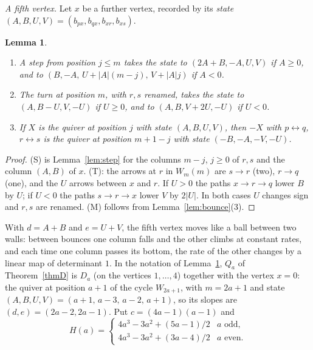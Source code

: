 \documentclass[11pt]{amsart}
\newtheorem{lemma}[theorem]{Lemma}
\theoremstyle{definition}
\theoremstyle{remark}
\begin{document}
\emph{A fifth vertex.} Let $x$ be a further vertex, recorded by its \emph{state} $(A,B,U,V)=(b_{px},b_{qx},b_{xr},b_{xs})$.

\begin{lemma}\label{lem:fifth}
\begin{enumerate}
\item[(S)] A step from position $j\le m$ takes the state to $(2A+B,-A,U,V)$ if $A\ge0$, and to $(B,-A,\,U+|A|(m-j),\,V+|A|j)$ if $A<0$.
\item[(T)] The turn at position $m$, with $r,s$ renamed, takes the state to $(A,B-U,V,-U)$ if $U\ge0$, and to $(A,B,V+2U,-U)$ if $U<0$.
\item[(M)] If $X$ is the quiver at position $j$ with state $(A,B,U,V)$, then $-X$ with $p\leftrightarrow q$, $r\leftrightarrow s$ is the quiver at position $m+1-j$ with state $(-B,-A,-V,-U)$.
\end{enumerate}
\end{lemma}
\begin{proof}
(S) is Lemma~\ref{lem:step} for the columns $m-j$, $j\ge0$ of $r,s$ and the column $(A,B)$ of $x$. (T): the arrows at $r$ in $W_m(m)$ are $s\to r$ (two), $r\to q$ (one), and the $U$ arrows between $x$ and $r$. If $U>0$ the paths $x\to r\to q$ lower $B$ by $U$; if $U<0$ the paths $s\to r\to x$ lower $V$ by $2|U|$. In both cases $U$ changes sign and $r,s$ are renamed. (M) follows from Lemma~\ref{lem:bounce}(3).
\end{proof}

With $d=A+B$ and $e=U+V$, the fifth vertex moves like a ball between two walls: between bounces one column falls and the other climbs at constant rates, and each time one column passes its bottom, the rate of the other changes by a linear map of determinant $1$. In the notation of Lemma~\ref{lem:fifth}, $Q_a$ of Theorem~\ref{thmD} is $D_a$ (on the vertices $1,\dots,4$) together with the vertex $x=0$: the quiver at position $a+1$ of the cycle $W_{2a+1}$, with $m=2a+1$ and state $(A,B,U,V)=(a+1,\,a-3,\,a-2,\,a+1)$, so its slopes are $(d,e)=(2a-2,2a-1)$. Put $c=(4a-1)(a-1)$ and
\[H(a)=\begin{cases}4a^3-3a^2+(5a-1)/2 & a\text{ odd},\\ 4a^3-3a^2+(3a-4)/2 & a\text{ even}.\end{cases}\]
\end{document}

